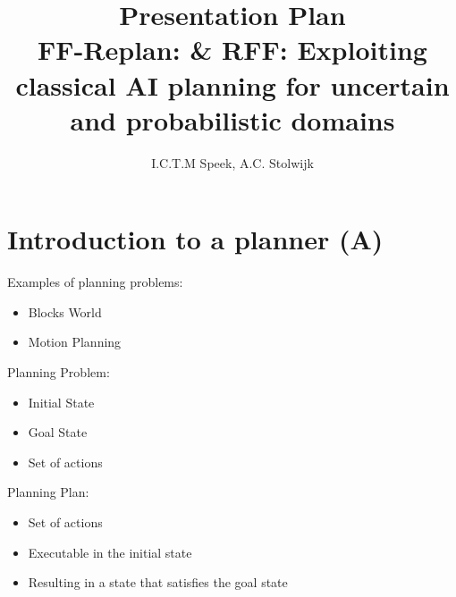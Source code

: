 \documentclass[runningheads,a4paper]{llncs}
\begin{document}
\mainmatter%

\title{Presentation Plan\\
FF-Replan: \& RFF\@: Exploiting classical AI planning for uncertain and probabilistic domains}


\author{I.C.T.M Speek, A.C. Stolwijk}

%



\maketitle

\section{Introduction to a planner (A)}



Examples of planning problems:

\begin{itemize}
	\item Blocks World
	\item Motion Planning
\end{itemize}

Planning Problem:

\begin{itemize}
	\item Initial State
	\item Goal State
	\item Set of actions
\end{itemize}

Planning Plan:

\begin{itemize}
	\item Set of actions
	\item Executable in the initial state
	\item Resulting in a state that satisfies the goal state
\end{itemize}
\end{document}
